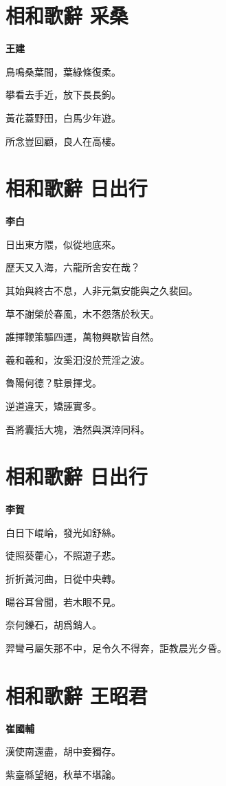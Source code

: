 \documentclass[12pt,a4paper]{ctexbook}
\begin{document}
\section{相和歌辭 采桑}
\textbf{王建}\par\vspace{0.5em}
鳥鳴桑葉間，葉綠條復柔。\par
攀看去手近，放下長長鉤。\par
黃花蓋野田，白馬少年遊。\par
所念豈回顧，良人在高樓。\par

\section{相和歌辭 日出行}
\textbf{李白}\par\vspace{0.5em}
日出東方隈，似從地底來。\par
歷天又入海，六龍所舍安在哉？\par
其始與終古不息，人非元氣安能與之久裴回。\par
草不謝榮於春風，木不怨落於秋天。\par
誰揮鞭策驅四運，萬物興歇皆自然。\par
羲和羲和，汝奚汩沒於荒淫之波。\par
魯陽何德？駐景揮戈。\par
逆道違天，矯誣實多。\par
吾將囊括大塊，浩然與溟涬同科。\par

\section{相和歌辭 日出行}
\textbf{李賀}\par\vspace{0.5em}
白日下崐崘，發光如舒絲。\par
徒照葵藿心，不照遊子悲。\par
折折黃河曲，日從中央轉。\par
暘谷耳曾聞，若木眼不見。\par
奈何鑠石，胡爲銷人。\par
羿彎弓屬矢那不中，足令久不得奔，詎教晨光夕昏。\par

\section{相和歌辭 王昭君}
\textbf{崔國輔}\par\vspace{0.5em}
漢使南還盡，胡中妾獨存。\par
紫臺緜望絕，秋草不堪論。\par
\end{document}
